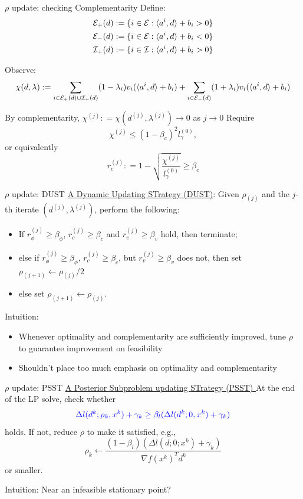 \documentclass[8pt]{beamer}
\begin{document}
	\begin{frame}{$\rho$ update: checking Complementarity}
		Define: 
		\[ \begin{aligned}
		{\cal E}_+(d) & := \{  i\in {\cal E}:  \langle a^i, d\rangle + b_i > 0\}\\
		{\cal E}_-(d) & := \{ i\in{\cal E}:  \langle a^i, d\rangle + b_i < 0\} \\
		{\cal I}_+(d) & := \{i \in{\cal I}: \langle a^i, d\rangle + b_i > 0\}
		\end{aligned}
		\]

		Observe: 
		\[ \chi(d,\lambda):= \sum_{i\in{\cal E}_+(d)\cup{\cal I}_+(d)} (1- \lambda_i) v_i(\langle a^i, d\rangle + b_i)  + \sum_{i\in{\cal E}_-(d)}( 1+\lambda_i)  v_i(\langle a^i, d\rangle + b_i) \]

		By complementarity,    {\blue $\chi^{(j)}: =  \chi(d^{(j)},\lambda^{(j)}) \to 0$  as $j\to 0$ }
		\vfill
		Require \[ \chi^{(j)} \le (1-\beta_c)^2 l^{(0)}_ \gamma, \] or equivalently
		{\red \[ r_c^{(j)}: =1- \sqrt{  \frac{ \chi^{(j)} }{l^{(0)}_ \gamma} } \ge \beta_c \]}
	\end{frame}


	\begin{frame}{$\rho$ update:  DUST} 
		\underline{ A {\blue D}ynamic {\blue U}pdating {\blue ST}rategy (DUST)}: 
		\vfill 
		Given $\rho_{(j)}$ and the $j$-th iterate $(d^{(j)}, \lambda^{(j)})$, perform the following:
		\begin{itemize}
			\item  If $r_{\phi}^{(j)} \ge \beta_\phi$, $r_c^{(j)} \ge \beta_c$ and $r_v^{(j)} \ge \beta_v$ hold, then terminate; 
			\item  else if $r_{\phi}^{(j)} \ge \beta_\phi$, $r_c^{(j)} \ge \beta_c$, but $r_v^{(j)} \ge \beta_v$ does not, then set $\rho_{(j+1)} \gets \rho_{(j)}/2$
			\item else set $\rho_{(j+1)} \gets \rho_{(j)}$.
		\end{itemize}
		\vfill
		{\blue \leftpointright Intuition:}  
		\begin{itemize}
			\item Whenever optimality and complementarity are sufficiently improved,  tune  $\rho$ to guarantee improvement on feasibility 
			\item Shouldn't place too much emphasis on optimality and complementarity
		\end{itemize}
	\end{frame}

	\begin{frame}{$\rho$ update:  PSST} 
		\underline{ A {\blue P}osterior {\blue S}ubproblem updating {\blue ST}rategy (PSST) }
		\vfill
		At the end of the LP solve, check whether 
		$${\color{blue}   \Delta l(d^k; \rho_k, x^k) +  \gamma_k \geq \beta_l (\Delta l(d^k; 0, x^k)+ \gamma_k) }$$
		holds.  If not, reduce $\rho$ to make it satisfied, e.g., 
		\[ \rho_k \gets \frac{(1-\beta_l)( \Delta l(d; 0;x^k)+\gamma_k) }{ \nabla f(x^k)^Td^k  } \]
			or smaller. 

		\vfill
		{\blue 	\leftpointright Intuition:}  Near an infeasible stationary point?
	\end{frame}
\end{document}
